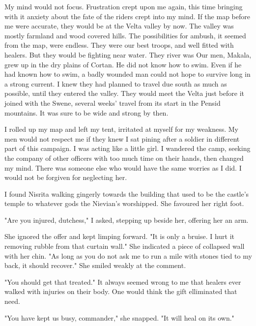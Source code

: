 \documentclass{article}
\begin{document}
My mind would not focus. Frustration crept upon me again, this time bringing with it anxiety about the fate of the riders crept into my mind. If the map before me were accurate, they would be at the Velta valley by now. The valley was mostly farmland and wood covered hills. The possibilities for ambush, it seemed from the map, were endless. They were our best troops, and well fitted with healers. But they would be fighting near water. They river was Our men, Makala, grew up in the dry plains of Cortan. He did not know how to swim. Even if he had known how to swim, a badly wounded man could not hope to survive long in a strong current. I knew they had planned to travel due south as much as possible, until they entered the valley. They would meet the Velta just before it joined with the Swene, several weeks' travel from its start in the Pensid mountains. It was sure to be wide and strong by then. 

I rolled up my map and left my tent, irritated at myself for my weakness. My men would not respect me if they knew I sat pining after a soldier in different part of this campaign. I was acting like a little girl. I wandered the camp, seeking the company of other officers with too much time on their hands, then changed my mind. There was someone else who would have the same worries as I did. I would not be forgiven for neglecting her.

I found Nisrita walking gingerly towards the building that used to be the castle's temple to whatever gods the Nievian's worshipped. She favoured her right foot. 

"Are you injured, dutchess," I asked, stepping up beside her, offering her an arm. 

She ignored the offer and kept limping forward. "It is only a bruise. I hurt it removing rubble from that curtain wall." She indicated a piece of collapsed wall with her chin. "As long as you do not ask me to run a mile with stones tied to my back, it should recover." She smiled weakly at the comment. 

"You should get that treated." It always seemed wrong to me that healers ever walked with injuries on their body. One would think the gift elliminated that need. 

"You have kept us busy, commander," she snapped. "It will heal on its own."
\end{document}
